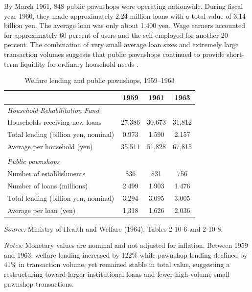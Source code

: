 \documentclass[12pt]{article}
\begin{document}
By March 1961, 848 public pawnshops were operating nationwide. During fiscal year 1960, they made approximately 2.24 million loans with a total value of 3.14 billion yen. The average loan was only about 1,400 yen. Wage earners accounted for approximately 60 percent of users and the self-employed for another 20 percent. The combination of very small average loan sizes and extremely large transaction volumes suggests that public pawnshops continued to provide short-term liquidity for ordinary household needs \citep{MinistryOfHealth1961}.

\begin{table}[htbp]
\centering
\caption{Welfare lending and public pawnshops, 1959--1963}
\label{tab:institutions}
\begin{threeparttable}
\begin{tabular}{@{\extracolsep{4pt}}lccc@{}}
\toprule
 & 1959 & 1961 & 1963 \\
\midrule
\multicolumn{4}{l}{\textit{Household Rehabilitation Fund}} \\
Households receiving new loans & 27,386 & 30,673 & 31,812 \\
Total lending (billion yen, nominal) & 0.973 & 1.590 & 2.157 \\
Average per household (yen) & 35,511 & 51,828 & 67,815 \\
\\
\multicolumn{4}{l}{\textit{Public pawnshops}} \\
Number of establishments & 836 & 831 & 756 \\
Number of loans (millions) & 2.499 & 1.903 & 1.476 \\
Total lending (billion yen, nominal) & 3.294 & 3.095 & 3.005 \\
Average per loan (yen) & 1,318 & 1,626 & 2,036 \\
\bottomrule
\end{tabular}
\begin{tablenotes}
\small
\item \textit{Source:} Ministry of Health and Welfare (1964), Tables 2-10-6 and 2-10-8.
\item \textit{Notes:} Monetary values are nominal and not adjusted for inflation. Between 1959 and 1963, welfare lending increased by 122\% while pawnshop lending declined by 41\% in transaction volume, yet remained stable in total value, suggesting a restructuring toward larger institutional loans and fewer high-volume small pawnshop transactions.
\end{tablenotes}
\end{threeparttable}
\end{table}
\end{document}

